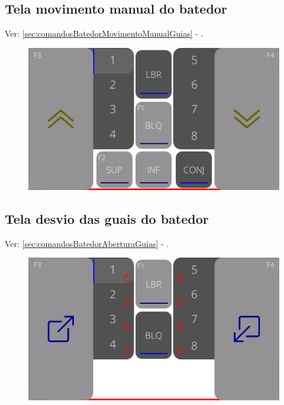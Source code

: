 \subsection{Tela movimento manual do batedor}
    Ver: \ref{sec:comandosBatedorMovimentoManualGuias} - .
\vspace*{\fill}
\begin{figure}[h]
  \centering
  \includegraphics{src/imagesICV/12-KTP400-scout/e-2.png}
\end{figure}
\vspace*{\fill}

\newpage
\thispagestyle{fancy}
\vspace*{40 pt}
\subsection{Tela desvio das guais do batedor}
    Ver: \ref{sec:comandosBatedorAberturaGuias} - .
\vspace*{\fill}
\begin{figure}[h]
  \centering
  \includegraphics{src/imagesICV/12-KTP400-scout/e-3.png}
\end{figure}
\vspace*{\fill}



